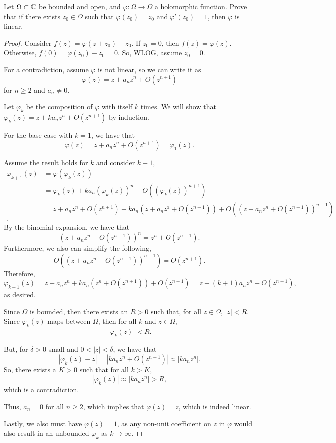 \documentclass[../hw2]{subfiles}
\begin{document}
\begin{problem}
Let $\Omega \subset \mathbb{C}$ be bounded and open, and $\varphi:\Omega\to \Omega$ a holomorphic function.
Prove that if there exists $z_0\in \Omega$ such that $\varphi(z_0)=z_0$ and $\varphi'(z_0) = 1$, then $\varphi$ is linear.
\end{problem}
\begin{proof}
Consider $f(z)=\varphi(z+z_0)-z_0$. 
If $z_0=0$, then $f(z)=\varphi(z)$. 
Otherwise, $f(0)=\varphi(z_0)-z_0=0$. 
So, WLOG, assume $z_0=0$. 

For a contradiction, assume $\varphi$ is not linear, so we can write it as  \[
\varphi(z)=z+a_n z^n + O(z^{n+1})
\] for $n\ge 2$ and $a_n\neq 0$. 

Let $\varphi_k$ be the composition of $\varphi$ with itself $k$ times.
We will show that $\varphi_k(z)=z+k a_n z^n + O(z^{n+1})$ by induction. 

For the base case with $k=1$, we have that \[
\varphi(z)=z+ a_n z^n + O(z^{n+1})=\varphi_1(z)
.\] 

Assume the result holds for $k$ and consider $k+1$, 
 \begin{align*}
  \varphi_{k+1}(z) &= \varphi(\varphi_k(z)) \\
  &= \varphi_k(z) + k a_n (\varphi_k(z))^n + O((\varphi_k(z))^{n+1}) \\
  &= z+a_n z^n + O(z^{n+1}) + k a_n (z+ a_n z^n + O(z^{n+1})) + O((z+ a_n z^n + O(z^{n+1}))^{n+1}) \\
.\end{align*}
By the binomial expansion, we have that \[
  (z+ a_n z^n + O(z^{n+1}))^n = z^n + O(z^{n+1})
.\] 
Furthermore, we also can simplify the following, \[
O((z+ a_n z^n + O(z^{n+1}))^{n+1})=O(z^{n+1})
.\] 
Therefore, \[
\varphi_{k+1}(z)=z+ a_n z^n + k a_n (z^n + O(z^{n+1})) + O(z^{n+1})
= z + (k+1) a_n z^n + O(z^{n+1})
,\] as desired.

Since $\Omega$ is bounded, then there exists an $R>0$ such that, for all $z\in \Omega$, $|z|<R$. 
Since $\varphi_k(z)$ maps between  $\Omega$, then for all $k$ and $z \in \Omega$,  \[
|\varphi_k(z)|<R
.\] 

But, for $\delta>0$ small and $0< |z| < \delta$, we have that \[
  |\varphi_k(z)-z| = |k a_n z^n + O(z^{n+1})| \approx |k a_n z^n |
.\] 
So, there exists a $K>0$ such that for all $k>K$, \[
|\varphi_k(z)| \approx |k a_n z^n | > R
,\] which is a contradiction.

Thus, $a_n = 0$ for all  $n \ge 2$, which implies that $\varphi(z)=z$, which is indeed linear. 

Lastly, we also must have $\varphi(z)=1$, as any non-unit coefficient on $z$ in $\varphi$ would also result in an unbounded $\varphi_k$ as $k\to \infty$.
\end{proof}
\end{document}
